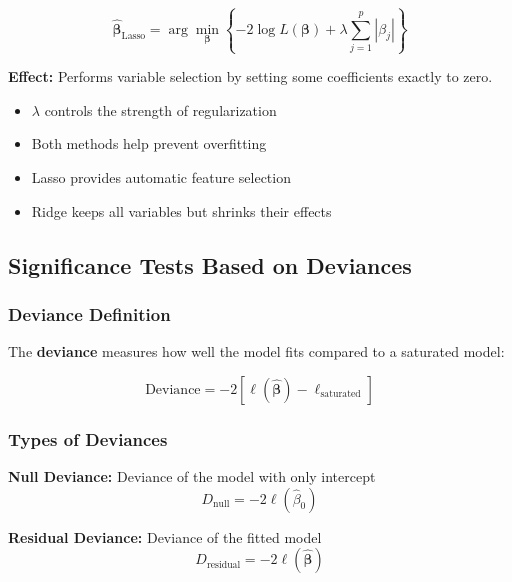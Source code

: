 \documentclass[12pt,a4paper]{article}
\begin{document}
\begin{equation}
\hat{\boldsymbol{\beta}}_{\text{Lasso}} = \arg\min_{\boldsymbol{\beta}} \left\{ -2 \log L(\boldsymbol{\beta}) + \lambda \sum_{j=1}^p |\beta_j| \right\}
\end{equation}

\textbf{Effect:} Performs variable selection by setting some coefficients exactly to zero.

\begin{tcolorbox}[colback=blue!5!white,colframe=blue!75!black,title=Note on Regularization]
\begin{itemize}
    \item $\lambda$ controls the strength of regularization
    \item Both methods help prevent overfitting
    \item Lasso provides automatic feature selection
    \item Ridge keeps all variables but shrinks their effects
\end{itemize}
\end{tcolorbox}

\subsection{Significance Tests Based on Deviances}

\subsubsection{Deviance Definition}

The \textbf{deviance} measures how well the model fits compared to a saturated model:

\begin{equation}
\text{Deviance} = -2[\ell(\hat{\boldsymbol{\beta}}) - \ell_{\text{saturated}}]
\end{equation}

\subsubsection{Types of Deviances}

\textbf{Null Deviance:} Deviance of the model with only intercept
\begin{equation}
D_{\text{null}} = -2\ell(\hat{\beta}_0)
\end{equation}

\textbf{Residual Deviance:} Deviance of the fitted model
\begin{equation}
D_{\text{residual}} = -2\ell(\hat{\boldsymbol{\beta}})
\end{equation}
\end{document}
